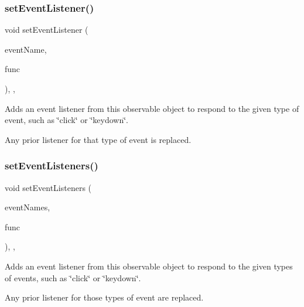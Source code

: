 \subsubsection{\texorpdfstring{set\+Event\+Listener()}{setEventListener()}\hspace{0.1cm}{\footnotesize\ttfamily [2/2]}}
{\footnotesize\ttfamily void set\+Event\+Listener (\begin{DoxyParamCaption}\item[{const std\+::string \&}]{event\+Name,  }\item[{G\+Event\+Listener\+Void}]{func }\end{DoxyParamCaption})\hspace{0.3cm}{\ttfamily [protected]}, {\ttfamily [virtual]}, {\ttfamily [inherited]}}



Adds an event listener from this observable object to respond to the given type of event, such as \char`\"{}click\char`\"{} or \char`\"{}keydown\char`\"{}. 

Any prior listener for that type of event is replaced. \mbox{\label{classGObservable_afa388d69c33c718cf035774604065604}} 
\subsubsection{\texorpdfstring{set\+Event\+Listeners()}{setEventListeners()}\hspace{0.1cm}{\footnotesize\ttfamily [1/2]}}
{\footnotesize\ttfamily void set\+Event\+Listeners (\begin{DoxyParamCaption}\item[{std\+::initializer\+\_\+list$<$ std\+::string $>$}]{event\+Names,  }\item[{G\+Event\+Listener}]{func }\end{DoxyParamCaption})\hspace{0.3cm}{\ttfamily [protected]}, {\ttfamily [virtual]}, {\ttfamily [inherited]}}



Adds an event listener from this observable object to respond to the given types of events, such as \char`\"{}click\char`\"{} or \char`\"{}keydown\char`\"{}. 

Any prior listener for those types of event are replaced. \mbox{\label{classGObservable_a7867184bbb686f74fae8a4db927da799}} 

